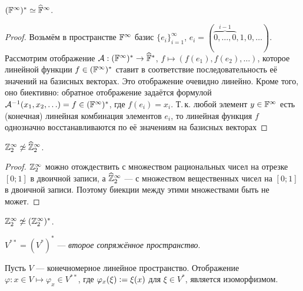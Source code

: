 \begin{proposal}
    $(\mathbb{F}^\infty)^\ast \simeq \widehat{\mathbb{F}}^\infty$.
\end{proposal}

\begin{proof}
    Возьмём в пространстве $\mathbb{F}^\infty$ базис $\{e_i\}_{i = 1}^\infty$, $e_i = (\overbrace{0, \ldots, 0}^{i - 1}, 1, 0, \ldots)$. Рассмотрим отображение $\mathcal{A}: (\mathbb{F}^\infty)^\ast \to \widehat{\mathbb{F}}^\ast$, $f \mapsto (f(e_1), f(e_2), \ldots)$, которое линейной функции $f \in (\mathbb{F}^\infty)^\ast$ ставит в соответствие последовательность её значений на базисных векторах. Это отображение очевидно линейно. Кроме того, оно биективно: обратное отображение задаётся формулой $\mathcal{A}^{-1}(x_1, x_2, \ldots) = f \in (\mathbb{F}^\infty)^\ast$, где $f(e_i) = x_i$. Т.\,к. любой элемент $y \in \mathbb{F}^\infty$ есть (конечная) линейная комбинация элементов $e_i$, то линейная функция $f$ однозначно восстанавливаются по её значениям на базисных векторах
\end{proof}

\begin{proposal}
    $\mathbb{Z}_2^\infty \not\simeq \widehat{\mathbb{Z}}_2^\infty$.
\end{proposal}

\begin{proof}
    $\mathbb{Z}_2^\infty$ можно отождествить с множеством рациональных чисел на отрезке $[0; 1]$ в двоичной записи, а $\widehat{\mathbb{Z}}_2^\infty$ --- с множеством вещественных чисел на $[0; 1]$ в двоичной записи. Поэтому биекции между этими множествами быть не может.
\end{proof}

\begin{corollary}
    $\mathbb{Z}_2^\infty \not\simeq (\mathbb{Z}_2^\infty)^\ast$.
\end{corollary}

\begin{definition}
    $V^{\ast\ast} = (V^\ast)^\ast$ --- \textit{второе сопряжённое пространство}.
\end{definition}

\begin{theorem}
    Пусть $V$ --- конечномерное линейное пространство. Отображение $\varphi: x \in V \mapsto \varphi_x \in V^{\ast\ast}$, где $\varphi_x(\xi) \vcentcolon = \xi(x)$ для $\xi \in V^\ast$, является изоморфизмом.
\end{theorem}

